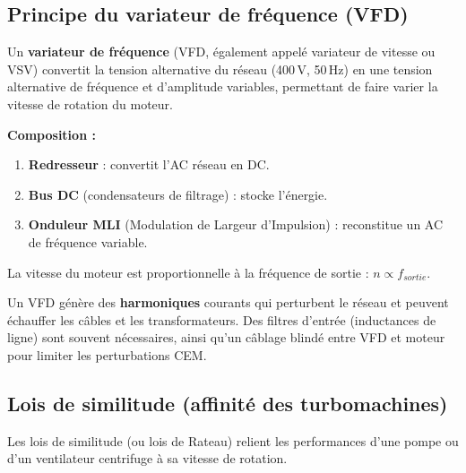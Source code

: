 \subsection{Principe du variateur de fréquence (VFD)}

\begin{definition}
  Un \textbf{variateur de fréquence} (VFD, également appelé variateur de vitesse ou VSV) convertit la tension alternative du réseau (400\,V, 50\,Hz) en une tension alternative de fréquence et d'amplitude variables, permettant de faire varier la vitesse de rotation du moteur.

  \textbf{Composition :}
  \begin{enumerate}
    \item \textbf{Redresseur} : convertit l'AC réseau en DC.
    \item \textbf{Bus DC} (condensateurs de filtrage) : stocke l'énergie.
    \item \textbf{Onduleur MLI} (Modulation de Largeur d'Impulsion) : reconstitue un AC de fréquence variable.
  \end{enumerate}
  La vitesse du moteur est proportionnelle à la fréquence de sortie : $n \propto f_{sortie}$.
\end{definition}

\begin{attention}
  Un VFD génère des \textbf{harmoniques} courants qui perturbent le réseau et peuvent échauffer les câbles et les transformateurs. Des filtres d'entrée (inductances de ligne) sont souvent nécessaires, ainsi qu'un câblage blindé entre VFD et moteur pour limiter les perturbations CEM.
\end{attention}

\subsection{Lois de similitude (affinité des turbomachines)}

Les lois de similitude (ou lois de Rateau) relient les performances d'une pompe ou d'un ventilateur centrifuge à sa vitesse de rotation.

